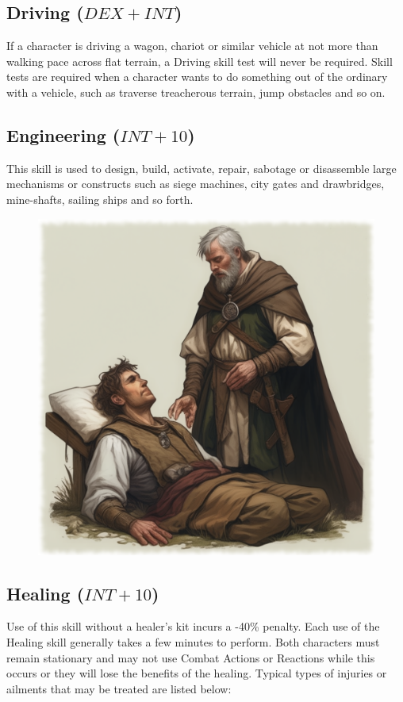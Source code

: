 \subsection{Driving ($DEX+INT$)}
If a character is driving a wagon, chariot or similar vehicle at not more than walking pace across flat terrain, a Driving skill test will never be required. Skill tests are required when a character wants to do something out of the ordinary with a vehicle, such as traverse treacherous terrain, jump obstacles and so on.

\subsection{Engineering ($INT+10$)}
This skill is used to design, build, activate, repair, sabotage or disassemble large mechanisms or constructs such as siege machines, city gates and drawbridges, mine-shafts, sailing ships and so forth. 

\begin{figure}[h]
\begin{center}
\includegraphics[scale=0.24]{img/ai-images/healer-tending.png}
\end{center}
\end{figure}

\subsection{Healing ($INT+10$)}
Use of this skill without a healer’s kit incurs a -40\% penalty. Each use of the Healing skill generally takes a few minutes to perform. Both characters must remain stationary and may not use Combat Actions or Reactions while this occurs or they will lose the benefits of the healing. Typical types of injuries or ailments that may be treated are listed below:

